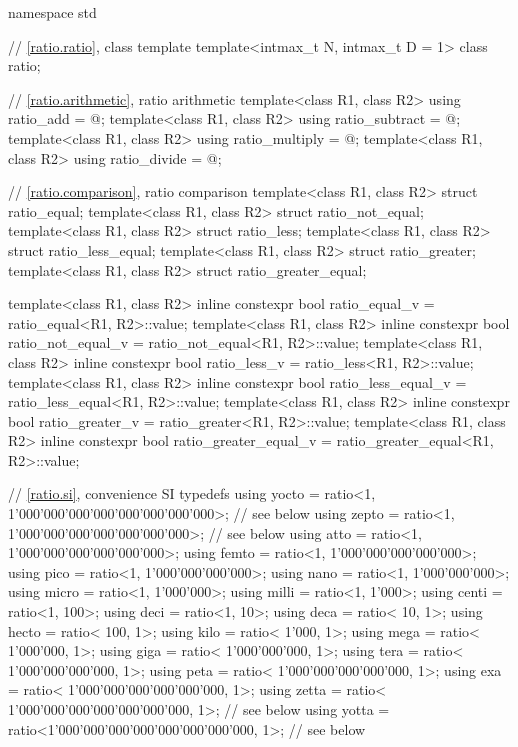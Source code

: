 %
\begin{codeblockdigitsep}
namespace std {
  // \ref{ratio.ratio}, class template 
  template<intmax_t N, intmax_t D = 1> class ratio;

  // \ref{ratio.arithmetic}, ratio arithmetic
  template<class R1, class R2> using ratio_add = @\seebelow@;
  template<class R1, class R2> using ratio_subtract = @\seebelow@;
  template<class R1, class R2> using ratio_multiply = @\seebelow@;
  template<class R1, class R2> using ratio_divide = @\seebelow@;

  // \ref{ratio.comparison}, ratio comparison
  template<class R1, class R2> struct ratio_equal;
  template<class R1, class R2> struct ratio_not_equal;
  template<class R1, class R2> struct ratio_less;
  template<class R1, class R2> struct ratio_less_equal;
  template<class R1, class R2> struct ratio_greater;
  template<class R1, class R2> struct ratio_greater_equal;

  template<class R1, class R2>
    inline constexpr bool ratio_equal_v = ratio_equal<R1, R2>::value;
  template<class R1, class R2>
    inline constexpr bool ratio_not_equal_v = ratio_not_equal<R1, R2>::value;
  template<class R1, class R2>
    inline constexpr bool ratio_less_v = ratio_less<R1, R2>::value;
  template<class R1, class R2>
    inline constexpr bool ratio_less_equal_v = ratio_less_equal<R1, R2>::value;
  template<class R1, class R2>
    inline constexpr bool ratio_greater_v = ratio_greater<R1, R2>::value;
  template<class R1, class R2>
    inline constexpr bool ratio_greater_equal_v = ratio_greater_equal<R1, R2>::value;

  // \ref{ratio.si}, convenience SI typedefs
  using yocto = ratio<1, 1'000'000'000'000'000'000'000'000>;  // see below
  using zepto = ratio<1,     1'000'000'000'000'000'000'000>;  // see below
  using atto  = ratio<1,         1'000'000'000'000'000'000>;
  using femto = ratio<1,             1'000'000'000'000'000>;
  using pico  = ratio<1,                 1'000'000'000'000>;
  using nano  = ratio<1,                     1'000'000'000>;
  using micro = ratio<1,                         1'000'000>;
  using milli = ratio<1,                             1'000>;
  using centi = ratio<1,                               100>;
  using deci  = ratio<1,                                10>;
  using deca  = ratio<                               10, 1>;
  using hecto = ratio<                              100, 1>;
  using kilo  = ratio<                            1'000, 1>;
  using mega  = ratio<                        1'000'000, 1>;
  using giga  = ratio<                    1'000'000'000, 1>;
  using tera  = ratio<                1'000'000'000'000, 1>;
  using peta  = ratio<            1'000'000'000'000'000, 1>;
  using exa   = ratio<        1'000'000'000'000'000'000, 1>;
  using zetta = ratio<    1'000'000'000'000'000'000'000, 1>;  // see below
  using yotta = ratio<1'000'000'000'000'000'000'000'000, 1>;  // see below
}
\end{codeblockdigitsep}

